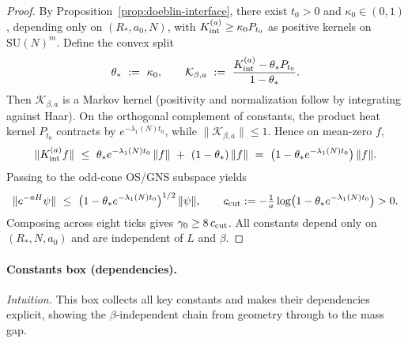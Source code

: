 \documentclass[11pt]{amsart}
\begin{document}
\begin{proof}
By Proposition~\ref{prop:doeblin-interface}, there exist $t_0>0$ and $\kappa_0\in(0,1)$, depending only on $(R_*,a_0,N)$, with $K_{\rm int}^{(a)}\ge \kappa_0 P_{t_0}$ as positive kernels on $\mathrm{SU}(N)^{m}$. Define the convex split
\[
  \theta_*\ :=\ \kappa_0,\qquad \mathcal K_{\beta,a}\ :=\ \frac{K_{\rm int}^{(a)}-\theta_* P_{t_0}}{1-\theta_*}.
\]
Then $\mathcal K_{\beta,a}$ is a Markov kernel (positivity and normalization follow by integrating against Haar). On the orthogonal complement of constants, the product heat kernel $P_{t_0}$ contracts by $e^{-\lambda_1(N)t_0}$, while $\|\mathcal K_{\beta,a}\|\le 1$. Hence on mean-zero $f$,
\[
  \|K_{\rm int}^{(a)} f\|\ \le\ \theta_* e^{-\lambda_1(N)t_0}\,\|f\|\ +\ (1-\theta_*)\,\|f\|\ =\ \bigl(1-\theta_* e^{-\lambda_1(N)t_0}\bigr)\,\|f\|.
\]
Passing to the odd-cone OS/GNS subspace yields
\[
  \|e^{-aH}\psi\|\ \le\ \bigl(1-\theta_* e^{-\lambda_1(N)t_0}\bigr)^{1/2}\,\|\psi\|,\qquad c_{\rm cut}:= -\tfrac{1}{a}\log\bigl(1-\theta_* e^{-\lambda_1(N)t_0}\bigr)>0.
\]
Composing across eight ticks gives $\gamma_0\ge 8\,c_{\rm cut}$. All constants depend only on $(R_*,N,a_0)$ and are independent of $L$ and $\beta$.
\end{proof}

\paragraph{Constants box (dependencies).}
\noindent\emph{Intuition.} This box collects all key constants and makes their dependencies explicit, showing the $\beta$-independent chain from geometry through to the mass gap.
\end{document}
